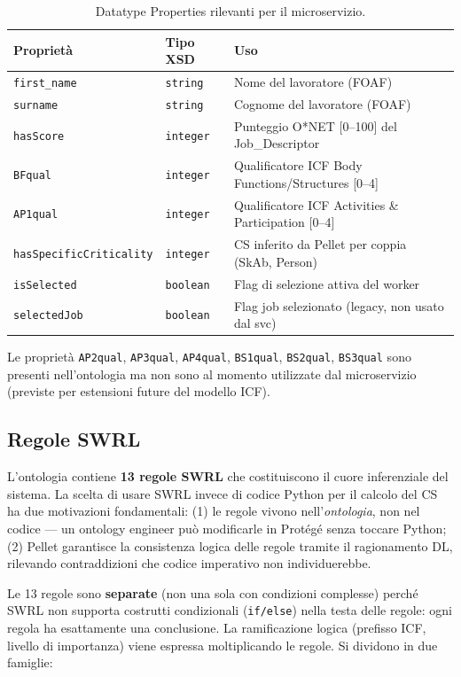 \documentclass[a4paper,12pt]{article}
\begin{document}
\begin{table}[H]
\centering
\caption{Datatype Properties rilevanti per il microservizio.}
\begin{tabular}{L{5cm} L{2.5cm} L{5cm}}
\toprule
\textbf{Propriet\`{a}} & \textbf{Tipo XSD} & \textbf{Uso} \\
\midrule
\texttt{first\_name} & \texttt{string} & Nome del lavoratore (FOAF) \\
\texttt{surname} & \texttt{string} & Cognome del lavoratore (FOAF) \\
\texttt{hasScore} & \texttt{integer} & Punteggio O*NET [0--100] del Job\_Descriptor \\
\texttt{BFqual} & \texttt{integer} & Qualificatore ICF Body Functions/Structures [0--4] \\
\texttt{AP1qual} & \texttt{integer} & Qualificatore ICF Activities \& Participation [0--4] \\
\texttt{hasSpecificCriticality} & \texttt{integer} & CS inferito da Pellet per coppia (SkAb, Person) \\
\texttt{isSelected} & \texttt{boolean} & Flag di selezione attiva del worker \\
\texttt{selectedJob} & \texttt{boolean} & Flag job selezionato (legacy, non usato dal svc) \\
\bottomrule
\end{tabular}
\end{table}

Le propriet\`{a} \texttt{AP2qual}, \texttt{AP3qual}, \texttt{AP4qual},
\texttt{BS1qual}, \texttt{BS2qual}, \texttt{BS3qual} sono presenti nell'ontologia
ma non sono al momento utilizzate dal microservizio (previste per
estensioni future del modello ICF).

\subsection{Regole SWRL}

L'ontologia contiene \textbf{13 regole SWRL} che costituiscono il cuore
inferenziale del sistema. La scelta di usare SWRL invece di codice Python
per il calcolo del CS ha due motivazioni fondamentali: (1) le regole
vivono nell'\textit{ontologia}, non nel codice --- un ontology engineer
pu\`{o} modificarle in Prot\'{e}g\'{e} senza toccare Python; (2) Pellet
garantisce la consistenza logica delle regole tramite il ragionamento DL,
rilevando contraddizioni che codice imperativo non individuerebbe.

Le 13 regole sono \textbf{separate} (non una sola con condizioni complesse)
perch\'{e} SWRL non supporta costrutti condizionali
(\texttt{if/else}) nella testa delle regole: ogni regola ha esattamente
una conclusione. La ramificazione logica (prefisso ICF, livello di importanza)
viene espressa moltiplicando le regole. Si dividono in due famiglie:
\end{document}
